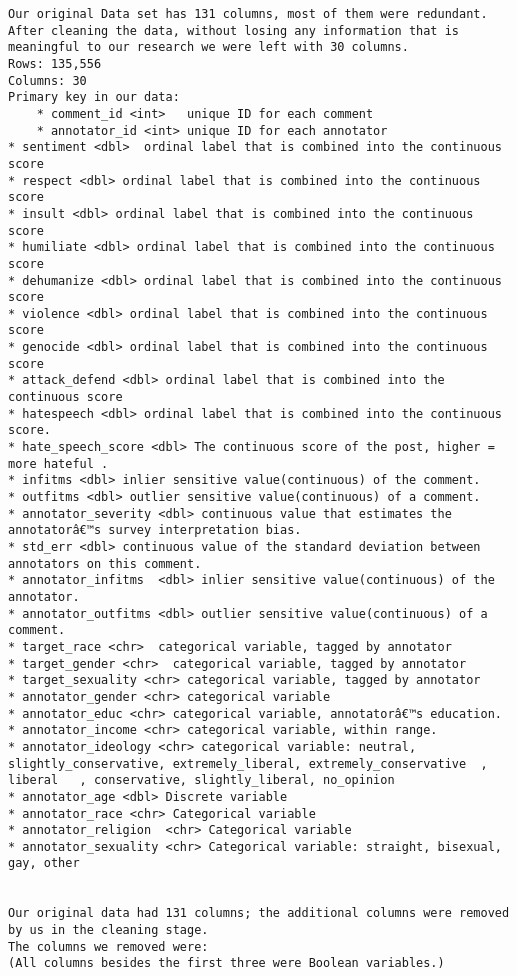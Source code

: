 \documentclass[
]{article}
\begin{document}
\begin{verbatim}
Our original Data set has 131 columns, most of them were redundant. After cleaning the data, without losing any information that is meaningful to our research we were left with 30 columns.
Rows: 135,556
Columns: 30
Primary key in our data:
    * comment_id <int>   unique ID for each comment
    * annotator_id <int> unique ID for each annotator
* sentiment <dbl>  ordinal label that is combined into the continuous score
* respect <dbl> ordinal label that is combined into the continuous score
* insult <dbl> ordinal label that is combined into the continuous score
* humiliate <dbl> ordinal label that is combined into the continuous score
* dehumanize <dbl> ordinal label that is combined into the continuous score
* violence <dbl> ordinal label that is combined into the continuous score
* genocide <dbl> ordinal label that is combined into the continuous score
* attack_defend <dbl> ordinal label that is combined into the continuous score
* hatespeech <dbl> ordinal label that is combined into the continuous score.
* hate_speech_score <dbl> The continuous score of the post, higher = more hateful .
* infitms <dbl> inlier sensitive value(continuous) of the comment.
* outfitms <dbl> outlier sensitive value(continuous) of a comment.
* annotator_severity <dbl> continuous value that estimates the annotatorâ€™s survey interpretation bias.
* std_err <dbl> continuous value of the standard deviation between annotators on this comment.
* annotator_infitms  <dbl> inlier sensitive value(continuous) of the annotator.
* annotator_outfitms <dbl> outlier sensitive value(continuous) of a comment.
* target_race <chr>  categorical variable, tagged by annotator
* target_gender <chr>  categorical variable, tagged by annotator
* target_sexuality <chr> categorical variable, tagged by annotator
* annotator_gender <chr> categorical variable
* annotator_educ <chr> categorical variable, annotatorâ€™s education.
* annotator_income <chr> categorical variable, within range.
* annotator_ideology <chr> categorical variable: neutral, slightly_conservative, extremely_liberal, extremely_conservative  , liberal   , conservative, slightly_liberal, no_opinion
* annotator_age <dbl> Discrete variable
* annotator_race <chr> Categorical variable
* annotator_religion  <chr> Categorical variable
* annotator_sexuality <chr> Categorical variable: straight, bisexual, gay, other
  
  
Our original data had 131 columns; the additional columns were removed by us in the cleaning stage.
The columns we removed were:
(All columns besides the first three were Boolean variables.)


\end{verbatim}
\end{document}
